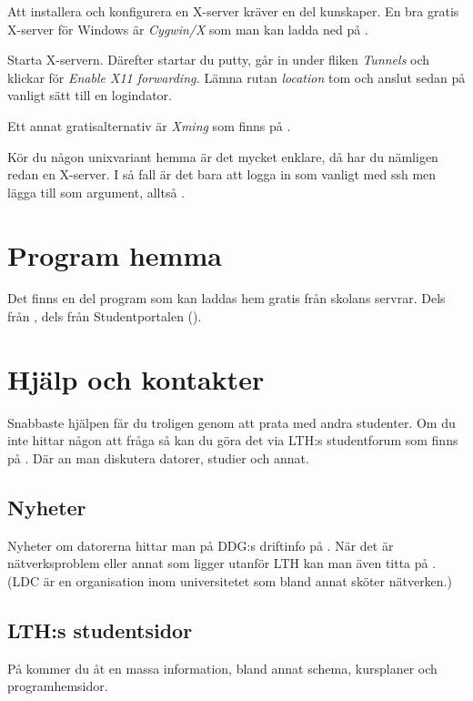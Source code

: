 \documentclass[a4paper,twocolumn]{book}
\begin{document}
Att installera och konfigurera en X-server kräver en del kunskaper. En bra
gratis X-server för Windows är \emph{Cygwin/X} som man kan ladda ned på 
.

Starta X-servern. Därefter startar du putty, går in under fliken
\emph{Tunnels} och klickar för \emph{Enable X11 forwarding.} Lämna rutan
\emph{location} tom och anslut sedan på vanligt sätt till en logindator.

Ett annat gratisalternativ är \emph{Xming} som finns på
.

Kör du någon unixvariant hemma är det mycket enklare, då har du nämligen redan
en X-server. I så fall är det bara att logga in som vanligt med ssh men lägga
till  som argument, alltså .

\section{Program hemma}

Det finns en del program som kan laddas hem gratis från skolans servrar. Dels
från , dels från Studentportalen 
(). 

\section{Hjälp och kontakter}

Snabbaste hjälpen får du troligen genom att prata med andra studenter. Om du
inte hittar någon att fråga så kan du göra det via LTH:s studentforum som
finns på . Där an man diskutera datorer, studier och
annat.

\subsection{Nyheter}
Nyheter om datorerna hittar man på DDG:s driftinfo på
. När det är nätverksproblem eller annat som ligger
utanför LTH kan man även titta på . (LDC är en
organisation inom universitetet som bland annat sköter nätverken.)

\subsection{LTH:s studentsidor}

På  kommer du åt en massa information, bland
annat schema, kursplaner och programhemsidor.
\end{document}
